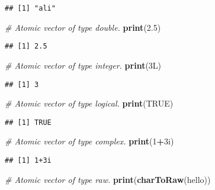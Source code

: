 \documentclass[
]{article}
\newenvironment{Shaded}{\begin{snugshade}}{\end{snugshade}}
\newcommand{\CommentTok}[1]{\textcolor[rgb]{0.56,0.35,0.01}{\textit{#1}}}
\newcommand{\ConstantTok}[1]{\textcolor[rgb]{0.56,0.35,0.01}{#1}}
\newcommand{\DecValTok}[1]{\textcolor[rgb]{0.00,0.00,0.81}{#1}}
\newcommand{\FloatTok}[1]{\textcolor[rgb]{0.00,0.00,0.81}{#1}}
\newcommand{\FunctionTok}[1]{\textcolor[rgb]{0.13,0.29,0.53}{\textbf{#1}}}
\newcommand{\NormalTok}[1]{#1}
\newcommand{\SpecialCharTok}[1]{\textcolor[rgb]{0.81,0.36,0.00}{\textbf{#1}}}
\newcommand{\StringTok}[1]{\textcolor[rgb]{0.31,0.60,0.02}{#1}}
\begin{document}
\begin{verbatim}
## [1] "ali"
\end{verbatim}

\begin{Shaded}
\begin{Highlighting}[]
\CommentTok{\# Atomic vector of type double.}
\FunctionTok{print}\NormalTok{(}\FloatTok{2.5}\NormalTok{)}
\end{Highlighting}
\end{Shaded}

\begin{verbatim}
## [1] 2.5
\end{verbatim}

\begin{Shaded}
\begin{Highlighting}[]
\CommentTok{\# Atomic vector of type integer.}
\FunctionTok{print}\NormalTok{(3L)}
\end{Highlighting}
\end{Shaded}

\begin{verbatim}
## [1] 3
\end{verbatim}

\begin{Shaded}
\begin{Highlighting}[]
\CommentTok{\# Atomic vector of type logical.}
\FunctionTok{print}\NormalTok{(}\ConstantTok{TRUE}\NormalTok{)}
\end{Highlighting}
\end{Shaded}

\begin{verbatim}
## [1] TRUE
\end{verbatim}

\begin{Shaded}
\begin{Highlighting}[]
\CommentTok{\# Atomic vector of type complex.}
\FunctionTok{print}\NormalTok{(}\DecValTok{1}\SpecialCharTok{+}\NormalTok{3i)}
\end{Highlighting}
\end{Shaded}

\begin{verbatim}
## [1] 1+3i
\end{verbatim}

\begin{Shaded}
\begin{Highlighting}[]
\CommentTok{\# Atomic vector of type raw.}
\FunctionTok{print}\NormalTok{(}\FunctionTok{charToRaw}\NormalTok{(}\StringTok{\textquotesingle{}hello\textquotesingle{}}\NormalTok{))}
\end{Highlighting}
\end{Shaded}
\end{document}
